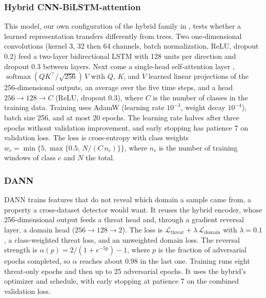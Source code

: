 \documentclass[conference]{IEEEtran}
\begin{document}
\subsubsection{Hybrid CNN-BiLSTM-attention} This model, our own configuration of the hybrid family in \cite{phalaagae2025}, tests whether a learned representation transfers differently from trees. Two one-dimensional convolutions (kernel 3, 32 then 64 channels, batch normalization, ReLU, dropout 0.2) feed a two-layer bidirectional LSTM with 128 units per direction and dropout 0.3 between layers. Next come a single-head self-attention layer \cite{vaswani2017}, $\operatorname{softmax}(QK^{\top}/\sqrt{256})\,V$ with $Q$, $K$, and $V$ learned linear projections of the 256-dimensional outputs, an average over the five time steps, and a head $256\to128\to C$ (ReLU, dropout 0.3), where $C$ is the number of classes in the training data. Training uses AdamW \cite{loshchilov2019} (learning rate $10^{-3}$, weight decay $10^{-4}$), batch size 256, and at most 20 epochs. The learning rate halves after three epochs without validation improvement, and early stopping has patience 7 on validation loss. The loss is cross-entropy with class weights $w_c=\min\{5,\max\{0.5,\,N/(C\,n_c)\}\}$, where $n_c$ is the number of training windows of class $c$ and $N$ the total.

\subsubsection{DANN} DANN \cite{ganin2016} trains features that do not reveal which domain a sample came from, a property a cross-dataset detector would want. It reuses the hybrid encoder, whose 256-dimensional output feeds a threat head and, through a gradient reversal layer, a domain head ($256\to128\to2$). The loss is $\mathcal{L}_{\mathrm{threat}}+\lambda\,\mathcal{L}_{\mathrm{domain}}$ with $\lambda=0.1$, a class-weighted threat loss, and an unweighted domain loss. The reversal strength is $\alpha(p)=2/(1+e^{-5p})-1$, where $p$ is the fraction of adversarial epochs completed, so $\alpha$ reaches about 0.98 in the last one. Training runs eight threat-only epochs and then up to 25 adversarial epochs. It uses the hybrid's optimizer and schedule, with early stopping at patience 7 on the combined validation loss.
\end{document}
